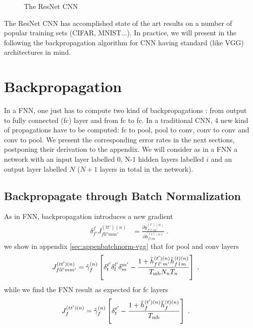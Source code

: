 \begin{figure}[H]
\begin{center}
\caption{The ResNet CNN}
\end{center}
\end{figure}


The ResNet CNN has accomplished state of the art results on a number of popular training sets (CIFAR, MNIST...). In practice, we will present in the following the backpropagation algorithm for CNN having standard (like VGG) architectures in mind.

\section{Backpropagation}

In a FNN, one just has to compute two kind of backpropagations : from output to fully connected (fc) layer and from fc to fc. In a traditional CNN, 4 new kind of propagations have to be computed: fc to pool, pool to conv, conv to conv and conv to pool. We present the corresponding error rates in the next sections, postponing their derivation to the appendix. We will consider as in a FNN a network with an input layer labelled $0$, N-1 hidden layers labelled $i$ and an output layer labelled $N$ ($N+1$ layers in total in the network).


\subsection{Backpropagate through Batch Normalization} \label{sec:BackpropbatchnormCNN}

As in FNN, backpropagation introduces a new gradient
\begin{align}
\delta^f_{f'}J^{(tt')(n)}_{fll'mm'}&=
%
\frac{\partial y^{(t')(n)}_{f'\,l'\,m'}}{\partial h_{f\,l\,m}^{(t)(\nu)}}\;.
\end{align}
we show in appendix \ref{sec:appenbatchnorm-vgg} that for pool and conv layers
\begin{align}
J^{(tt')(n)}_{fll'mm'}&=\tilde{\gamma}^{(n)}_f \left[\delta^{t'}_t\delta^{l'}_l\delta^{m'}_m-
%
\frac{1+\tilde{h}_{f\,l'\,m'}^{(t')(n)}\tilde{h}_{f\,l\,m}^{(t)(n)}}{T_{{\rm mb}}N_nT_n}\right]\;,
\end{align}
while we find the FNN result as expected for fc layers
\begin{align}
J^{(tt')(n)}_{f}&=\tilde{\gamma}^{(n)}_f \left[\delta^{t'}_t-
%
\frac{1+\tilde{h}_{f}^{(t')(n)}\tilde{h}_{f}^{(t)(n)}}{T_{{\rm mb}}}\right]\;.
\end{align}

